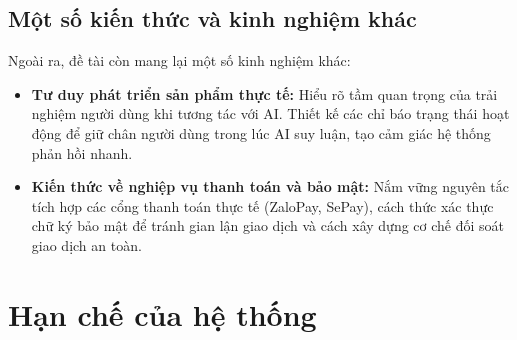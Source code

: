 \FloatBarrier
\subsection{Một số kiến thức và kinh nghiệm khác}

Ngoài ra, đề tài còn mang lại một số kinh nghiệm khác:
\begin{itemize}
    \item \textbf{Tư duy phát triển sản phẩm thực tế:} Hiểu rõ tầm quan trọng của trải nghiệm người dùng khi tương tác với AI. Thiết kế các chỉ báo trạng thái hoạt động để giữ chân người dùng trong lúc AI suy luận, tạo cảm giác hệ thống phản hồi nhanh.
    \item \textbf{Kiến thức về nghiệp vụ thanh toán và bảo mật:} Nắm vững nguyên tắc tích hợp các cổng thanh toán thực tế (ZaloPay, SePay), cách thức xác thực chữ ký bảo mật để tránh gian lận giao dịch và cách xây dựng cơ chế đối soát giao dịch an toàn.
\end{itemize}

\section{Hạn chế của hệ thống}

